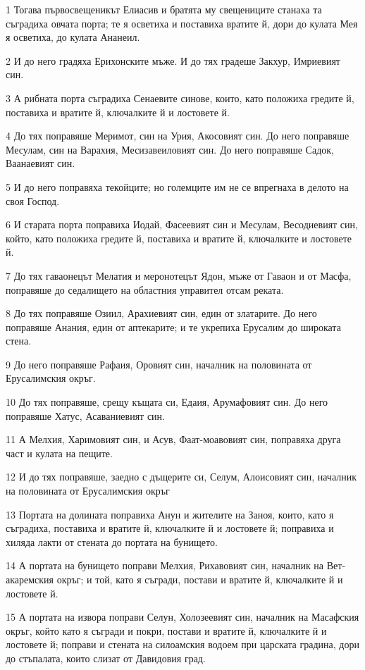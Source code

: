 \par 1 Тогава първосвещеникът Елиасив и братята му свещениците станаха та съградиха овчата порта; те я осветиха и поставиха вратите й, дори до кулата Мея я осветиха, до кулата Ананеил.
\par 2 И до него градяха Ерихонските мъже. И до тях градеше Закхур, Имриевият син.
\par 3 А рибната порта съградиха Сенаевите синове, които, като положиха гредите й, поставиха и вратите й, ключалките й и лостовете й.
\par 4 До тях поправяше Меримот, син на Урия, Акосовият син. До него поправяше Месулам, син на Варахия, Месизавеиловият син. До него поправяше Садок, Ваанаевият син.
\par 5 И до него поправяха текойците; но големците им не се впрегнаха в делото на своя Господ.
\par 6 И старата порта поправиха Иодай, Фасеевият син и Месулам, Весодиевият син, който, като положиха гредите й, поставиха и вратите й, ключалките и лостовете й.
\par 7 До тях гаваонецът Мелатия и меронотецът Ядон, мъже от Гаваон и от Масфа, поправяше до седалището на областния управител отсам реката.
\par 8 До тях поправяше Озиил, Арахиевият син, един от златарите. До него поправяше Анания, един от аптекарите; и те укрепиха Ерусалим до широката стена.
\par 9 До него поправяше Рафаия, Оровият син, началник на половината от Ерусалимския окръг.
\par 10 До тях поправяше, срещу къщата си, Едаия, Арумафовият син. До него поправяше Хатус, Асаваниевият син.
\par 11 А Мелхия, Харимовият син, и Асув, Фаат-моавовият син, поправяха друга част и кулата на пещите.
\par 12 И до тях поправяше, заедно с дъщерите си, Селум, Алоисовият син, началник на половината от Ерусалимския окръг
\par 13 Портата на долината поправиха Анун и жителите на Заноя, които, като я съградиха, поставиха и вратите й, ключалките й и лостовете й; поправиха и хиляда лакти от стената до портата на бунището.
\par 14 А портата на бунището поправи Мелхия, Рихавовият син, началник на Вет-акаремския окръг; и той, като я съгради, постави и вратите й, ключалките й и лостовете й.
\par 15 А портата на извора поправи Селун, Холозеевият син, началник на Масафския окръг, който като я съгради и покри, постави и вратите й, ключалките й и лостовете й; поправи и стената на силоамския водоем при царската градина, дори до стъпалата, които слизат от Давидовия град.

